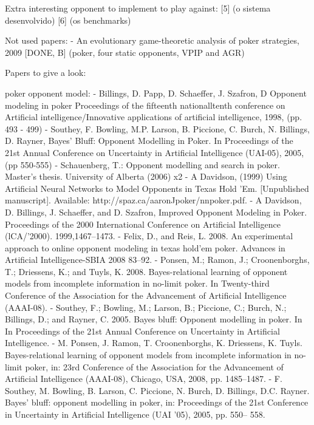 Extra interesting opponent to implement to play against:
[5] (o sistema desenvolvido)
[6] (os benchmarks)


Not used papers:
- An evolutionary game-theoretic analysis of poker strategies, 2009 [DONE, B] (poker, four static opponents, VPIP and AGR)


Papers to give a look:

poker opponent model:
- Billings, D. Papp, D. Schaeffer, J. Szafron, D Opponent modeling in
poker Proceedings of the fifteenth nationalltenth conference on
Artificial intelligence/Innovative applications of artificial
intelligence, 1998, (pp. 493 - 499)
- Southey, F. Bowling, M.P. Larson, B. Piccione, C. Burch, N. Billings,
D. Rayner, Bayes' Bluff: Opponent Modelling in Poker. In
Proceedings of the 21st Annual Conference on Uncertainty in
Artificial Intelligence (UAI-05), 2005, (pp 550-555)
- Schauenberg, T.: Opponent modelling and search in poker. Master’s thesis. University of
Alberta (2006) x2
- A Davidson, (1999) Using Artificial Neural Networks to Model
Opponents in Texas Hold 'Em. [Unpublished manuscript]. Available:
http://spaz.ca/aaronJpoker/nnpoker.pdf.
- A Davidson, D. Billings, J. Schaeffer, and D. Szafron, Improved
Opponent Modeling in Poker. Proceedings of the 2000 International
Conference on Artificial Intelligence (lCA/'2000). 1999,1467--1473.
- Felix, D., and Reis, L. 2008. An experimental approach to
online opponent modeling in texas hold’em poker. Advances
in Artificial Intelligence-SBIA 2008 83–92.
- Ponsen, M.; Ramon, J.; Croonenborghs, T.; Driessens, K.;
and Tuyls, K. 2008. Bayes-relational learning of opponent
models from incomplete information in no-limit poker. In
Twenty-third Conference of the Association for the Advancement
of Artificial Intelligence (AAAI-08).
- Southey, F.; Bowling, M.; Larson, B.; Piccione, C.; Burch,
N.; Billings, D.; and Rayner, C. 2005. Bayes bluff: Opponent
modelling in poker. In In Proceedings of the 21st
Annual Conference on Uncertainty in Artificial Intelligence.
- M. Ponsen, J. Ramon, T. Croonenborghs, K. Driessens, K. Tuyls. Bayes-relational
learning of opponent models from incomplete information in no-limit poker,
in: 23rd Conference of the Association for the Advancement of Artificial
Intelligence (AAAI-08), Chicago, USA, 2008, pp. 1485–1487.
- F. Southey, M. Bowling, B. Larson, C. Piccione, N. Burch, D. Billings, D.C. Rayner.
Bayes’ bluff: opponent modelling in poker, in: Proceedings of the 21st
Conference in Uncertainty in Artificial Intelligence (UAI ’05), 2005, pp. 550–
558.

